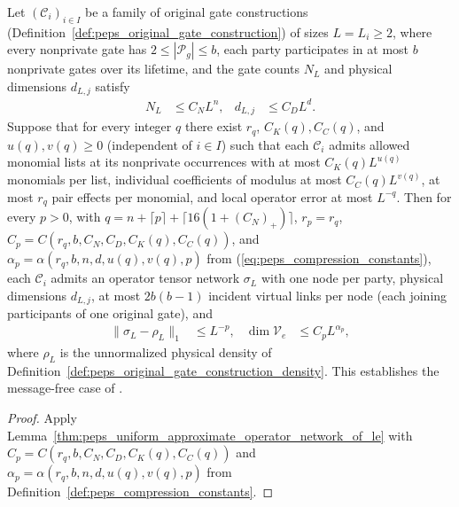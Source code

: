 \begin{lemma}
    \label{thm:peps_uniform_approximate_operator_network}
    \leanok
    Let $(\mathcal C_i)_{i\in I}$ be a family of original gate constructions (Definition~\ref{def:peps_original_gate_construction}) of sizes $L=L_i\ge2$, where every nonprivate gate has $2\le|\mathcal P_g|\le b$, each party participates in at most $b$ nonprivate gates over its lifetime, and the gate counts $N_L$ and physical dimensions $d_{L,j}$ satisfy
    \begin{align}
        N_L     & \le C_NL^n, &
        d_{L,j} & \le C_DL^d.
    \end{align}
    Suppose that for every integer $q$ there exist $r_q$, $C_K(q),C_C(q)$, and $u(q),v(q)\ge0$ (independent of $i\in I$) such that each $\mathcal C_i$ admits allowed monomial lists at its nonprivate occurrences with at most $C_K(q)L^{u(q)}$ monomials per list, individual coefficients of modulus at most $C_C(q)L^{v(q)}$, at most $r_q$ pair effects per monomial, and local operator error at most $L^{-q}$.
    Then for every $p>0$, with $q=n+\lceil p\rceil+\lceil16(1+(C_N)_+)\rceil$, $r_p=r_q$, $C_p=C(r_q,b,C_N,C_D,C_K(q),C_C(q))$, and $\alpha_p=\alpha(r_q,b,n,d,u(q),v(q),p)$ from (\ref{eq:peps_compression_constants}), each $\mathcal C_i$ admits an operator tensor network $\sigma_L$ with one node per party, physical dimensions $d_{L,j}$, at most $2b(b-1)$ incident virtual links per node (each joining participants of one original gate), and
    \begin{align}
        \lVert\sigma_L-\rho_L\rVert_1 & \le L^{-p},          &
        \dim\mathcal V_e              & \le C_pL^{\alpha_p},
    \end{align}
    where $\rho_L$ is the unnormalized physical density of Definition~\ref{def:peps_original_gate_construction_density}. This establishes the message-free case of \cite[Theorem~5.2]{OpenAI2026PolynomialPEPS}.
\end{lemma}
\begin{proof}
    \leanok
    Apply Lemma~\ref{thm:peps_uniform_approximate_operator_network_of_le} with $C_p=C(r_q,b,C_N,C_D,C_K(q),C_C(q))$ and $\alpha_p=\alpha(r_q,b,n,d,u(q),v(q),p)$ from Definition~\ref{def:peps_compression_constants}.
\end{proof}
